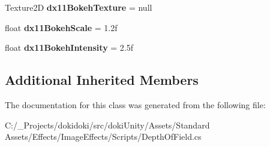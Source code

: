 \begin{DoxyCompactItemize}
\item 
Texture2D {\bfseries dx11\+Bokeh\+Texture} = null\hypertarget{class_unity_standard_assets_1_1_image_effects_1_1_depth_of_field_af8ca61f949a81d24c895977dd0d2e390}{}\label{class_unity_standard_assets_1_1_image_effects_1_1_depth_of_field_af8ca61f949a81d24c895977dd0d2e390}

\item 
float {\bfseries dx11\+Bokeh\+Scale} = 1.\+2f\hypertarget{class_unity_standard_assets_1_1_image_effects_1_1_depth_of_field_aba6dc6afacf45f686c40dbdd7ead1505}{}\label{class_unity_standard_assets_1_1_image_effects_1_1_depth_of_field_aba6dc6afacf45f686c40dbdd7ead1505}

\item 
float {\bfseries dx11\+Bokeh\+Intensity} = 2.\+5f\hypertarget{class_unity_standard_assets_1_1_image_effects_1_1_depth_of_field_ac8b7ae7038cb3b009cd8084fa67eae37}{}\label{class_unity_standard_assets_1_1_image_effects_1_1_depth_of_field_ac8b7ae7038cb3b009cd8084fa67eae37}

\end{DoxyCompactItemize}
\subsection*{Additional Inherited Members}


The documentation for this class was generated from the following file\+:\begin{DoxyCompactItemize}
\item 
C\+:/\+\_\+\+Projects/dokidoki/src/doki\+Unity/\+Assets/\+Standard Assets/\+Effects/\+Image\+Effects/\+Scripts/Depth\+Of\+Field.\+cs\end{DoxyCompactItemize}

